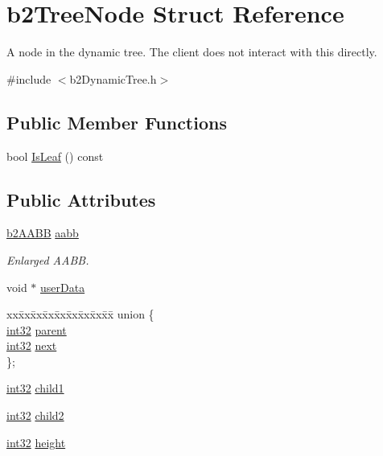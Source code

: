 \hypertarget{structb2_tree_node}{}\section{b2\+Tree\+Node Struct Reference}
\label{structb2_tree_node}


A node in the dynamic tree. The client does not interact with this directly.  




{\ttfamily \#include $<$b2\+Dynamic\+Tree.\+h$>$}

\subsection*{Public Member Functions}
\begin{DoxyCompactItemize}
\item 
bool \mbox{\hyperlink{structb2_tree_node_a540267ce6fa890822f1eea2d1967f646}{Is\+Leaf}} () const
\end{DoxyCompactItemize}
\subsection*{Public Attributes}
\begin{DoxyCompactItemize}
\item 
\mbox{\hyperlink{structb2_a_a_b_b}{b2\+A\+A\+BB}} \mbox{\hyperlink{structb2_tree_node_a798f1a594b33c713be45e76e79912239}{aabb}}
\begin{DoxyCompactList}\small\item\em Enlarged A\+A\+BB. \end{DoxyCompactList}\item 
void $\ast$ \mbox{\hyperlink{structb2_tree_node_aff77b3eb48326aca1b0762f5c45e56e7}{user\+Data}}
\item 
\begin{tabbing}
xx\=xx\=xx\=xx\=xx\=xx\=xx\=xx\=xx\=\kill
union \{\\
\>\mbox{\hyperlink{b2_settings_8h_a43d43196463bde49cb067f5c20ab8481}{int32}} \mbox{\hyperlink{structb2_tree_node_a6d293fa25192db51808ebec05ee7e56e}{parent}}\\
\>\mbox{\hyperlink{b2_settings_8h_a43d43196463bde49cb067f5c20ab8481}{int32}} \mbox{\hyperlink{structb2_tree_node_a67ac768e9227b165198d3d4e2299f9b3}{next}}\\
\}; \\

\end{tabbing}\item 
\mbox{\hyperlink{b2_settings_8h_a43d43196463bde49cb067f5c20ab8481}{int32}} \mbox{\hyperlink{structb2_tree_node_a3a320f2afc7d223e92ee3629602be5ca}{child1}}
\item 
\mbox{\hyperlink{b2_settings_8h_a43d43196463bde49cb067f5c20ab8481}{int32}} \mbox{\hyperlink{structb2_tree_node_aa6774ce329715b20d8b7cc8b6e3d50bc}{child2}}
\item 
\mbox{\hyperlink{b2_settings_8h_a43d43196463bde49cb067f5c20ab8481}{int32}} \mbox{\hyperlink{structb2_tree_node_acd183ac94a8d44195c787111be4c22e2}{height}}
\end{DoxyCompactItemize}


